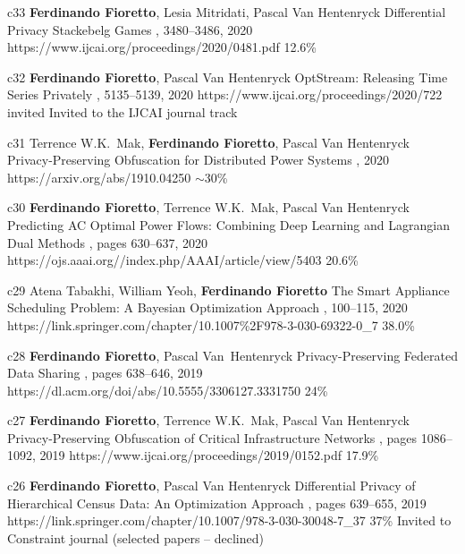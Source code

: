 \begin{pubs}
	\confentry
		{c33} %
		{{\bf Ferdinando Fioretto}, Lesia Mitridati, Pascal Van Hentenryck}
		{Differential Privacy Stackebelg Games}
		{\procIJCAI, 3480--3486, 2020}
		{https://www.ijcai.org/proceedings/2020/0481.pdf}
	    {12.6\%}

	\confentryAwd
		{c32} %
		{{\bf Ferdinando Fioretto}, Pascal Van Hentenryck}
		{OptStream: Releasing Time Series Privately}
		{\procIJCAI, 5135--5139, 2020}
	    {https://www.ijcai.org/proceedings/2020/722}
		{invited}
		{Invited to the IJCAI journal track}{}
	
	\confentry
		{c31} %
		{Terrence W.K.~Mak, {\bf Ferdinando Fioretto}, Pascal Van Hentenryck}
		{Privacy-Preserving Obfuscation for Distributed Power Systems}
		{\procPSCC, 2020}
		{https://arxiv.org/abs/1910.04250}
	    {$\sim$30\%} %

	\confentry
		{c30} %
		{{\bf Ferdinando Fioretto}, Terrence W.K.~Mak, Pascal Van Hentenryck}
		{Predicting AC Optimal Power Flows: Combining Deep Learning and Lagrangian Dual Methods}
	  	{\procAAAI, pages 630--637, 2020}
	  	{https://ojs.aaai.org//index.php/AAAI/article/view/5403}
	    {20.6\%} %

	\confentry
		{c29} %
	    {Atena Tabakhi, William Yeoh, {\bf Ferdinando Fioretto}}
	    {The Smart Appliance Scheduling Problem: A Bayesian Optimization Approach}
	    {\procPRIMA, 100--115, 2020}
	    {https://link.springer.com/chapter/10.1007\%2F978-3-030-69322-0\_7}
	    {38.0\%} %

	\confentry
		{c28} %
		{{\bf Ferdinando Fioretto}, Pascal Van~Hentenryck}
		{Privacy-Preserving Federated Data Sharing}
	  	{\procAAMAS, pages 638--646, 2019}
	  	{https://dl.acm.org/doi/abs/10.5555/3306127.3331750}
		{24\%} %

	\confentry
		{c27} %
		{{\bf Ferdinando Fioretto}, Terrence W.K.~Mak, Pascal Van Hentenryck}
		{Privacy-Preserving Obfuscation of Critical Infrastructure Networks}
	  	{\procIJCAI, pages 1086--1092, 2019}
	  	{https://www.ijcai.org/proceedings/2019/0152.pdf}
	    {17.9\%} %

	\confentryAwd
		{c26} %
		{{\bf Ferdinando Fioretto}, Pascal Van Hentenryck}
		{Differential Privacy of Hierarchical Census Data: An Optimization Approach} 
		{\procCP, pages 639--655, 2019}
		{https://link.springer.com/chapter/10.1007/978-3-030-30048-7\_37}
		{37\%}
		{Invited to Constraint journal}
		{(selected papers -- declined)}


\end{pubs}

